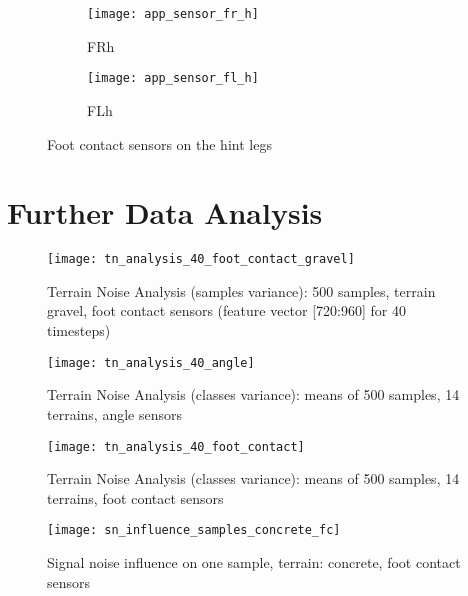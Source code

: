\begin{figure}[H]
\centering
\begin{subfigure}{0.48\textwidth}
  \centering
  \texttt{[image: app\_sensor\_fr\_h]}
  \caption{FRh}
  \label{fig:app_fr_h}
\end{subfigure}
\begin{subfigure}{0.48\textwidth}
  \centering
  \texttt{[image: app\_sensor\_fl\_h]}
  \caption{FLh}
  \label{fig:app_fl_h}
\end{subfigure}
\caption{Foot contact sensors on the hint legs}
\label{fig:app_f_h}
\end{figure}

\section{Further Data Analysis} \label{sec:further_data_analysis}

\begin{figure}[H]
  \centering
  \texttt{[image: tn\_analysis\_40\_foot\_contact\_gravel]}
  \caption{Terrain Noise Analysis (samples variance): 500 samples, terrain gravel, foot contact sensors (feature vector [720:960] for 40 timesteps)}
  \label{fig:tn_analysis_foot_contact_gravel}
\end{figure}

\begin{figure}[H]
  \centering
  \texttt{[image: tn\_analysis\_40\_angle]}
  \caption{Terrain Noise Analysis (classes variance): means of 500 samples, 14 terrains, angle sensors}
  \label{fig:tn_analysis_angle}
\end{figure}

\begin{figure}[H]
  \centering
  \texttt{[image: tn\_analysis\_40\_foot\_contact]}
  \caption{Terrain Noise Analysis (classes variance): means of 500 samples, 14 terrains, foot contact sensors}
  \label{fig:tn_analysis_foot_contact}
\end{figure}

\begin{figure}[H]
  \centering
  \texttt{[image: sn\_influence\_samples\_concrete\_fc]}
  \caption{Signal noise influence on one sample, terrain: concrete, foot contact sensors}
  \label{fig:sn_influence_samples_concrete_fc}
\end{figure}

%
